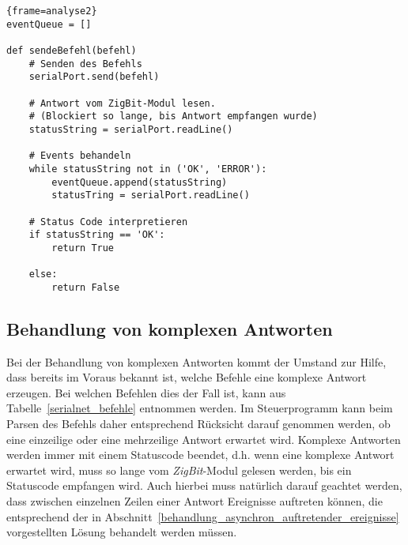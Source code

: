             \begin{lstlisting}{frame=analyse2}
eventQueue = []

def sendeBefehl(befehl)
    # Senden des Befehls
    serialPort.send(befehl)

    # Antwort vom ZigBit-Modul lesen.
    # (Blockiert so lange, bis Antwort empfangen wurde)
    statusString = serialPort.readLine()

    # Events behandeln 
    while statusString not in ('OK', 'ERROR'):
        eventQueue.append(statusString)
        statusTring = serialPort.readLine()

    # Status Code interpretieren
    if statusString == 'OK':
        return True
    
    else:
        return False
            \end{lstlisting}

        \subsection{Behandlung von komplexen Antworten}
            \label{behandlung_von_komplexen_antworten}
            Bei der Behandlung von komplexen Antworten kommt der Umstand zur Hilfe, dass bereits
            im Voraus bekannt ist, welche Befehle eine komplexe Antwort erzeugen. Bei welchen Befehlen dies
            der Fall ist, kann aus Tabelle~\ref{serialnet_befehle} entnommen werden. Im Steuerprogramm kann beim
            Parsen des Befehls daher entsprechend Rücksicht darauf genommen werden, ob eine einzeilige oder
            eine mehrzeilige Antwort erwartet wird. Komplexe Antworten werden immer mit einem Statuscode
            beendet, d.h. wenn eine komplexe Antwort erwartet wird, muss so lange vom \emph{ZigBit}-Modul
            gelesen werden, bis ein Statuscode empfangen wird. Auch hierbei muss natürlich darauf geachtet
            werden, dass zwischen einzelnen Zeilen einer Antwort Ereignisse auftreten können, die entsprechend
            der in Abschnitt~\ref{behandlung_asynchron_auftretender_ereignisse} vorgestellten Lösung behandelt 
            werden müssen.


